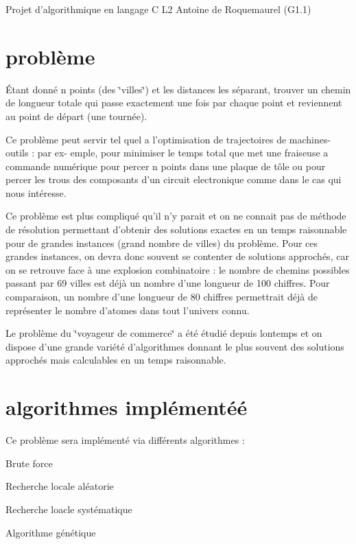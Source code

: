 Projet d'algorithmique en langage C L2 Antoine de Roquemaurel (G1.1) \hypertarget{index_Le}{}\section{problème}\label{index_Le}
Étant donné n points (des \char`\"{}villes\char`\"{}) et les distances les séparant, trouver un chemin de longueur totale qui passe exactement une fois par chaque point et reviennent au point de départ (une tournée).

Ce problème peut servir tel quel a l'optimisation de trajectoires de machines-\/outils : par ex-\/ emple, pour minimiser le temps total que met une fraiseuse a commande numérique pour percer n points dans une plaque de tôle ou pour percer les trous des composants d'un circuit electronique comme dans le cas qui nous intéresse.

Ce problème est plus compliqué qu'il n'y parait et on ne connait pas de méthode de résolution permettant d'obtenir des solutions exactes en un temps raisonnable pour de grandes instances (grand nombre de villes) du problème. Pour ces grandes instances, on devra donc souvent se contenter de solutions approchés, car on se retrouve face à une explosion combinatoire : le nombre de chemins possibles passant par 69 villes est déjà un nombre d’une longueur de 100 chiffres. Pour comparaison, un nombre d'une longueur de 80 chiffres permettrait déjà de représenter le nombre d'atomes dans tout l'univers connu.

Le problème du \char`\"{}voyageur de commerce\char`\"{} a été étudié depuis lontemps et on dispose d’une grande variété d'algorithmes donnant le plus souvent des solutions approchés mais calculables en un temps raisonnable.\hypertarget{index_Les}{}\section{algorithmes implémentéé}\label{index_Les}
Ce problème sera implémenté via différents algorithmes :
\begin{DoxyItemize}
\item Brute force
\item Recherche locale aléatorie
\item Recherche loacle systématique
\item Algorithme génétique 
\end{DoxyItemize}